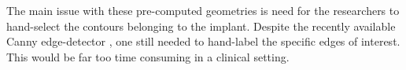 The main issue with these pre-computed geometries is need for the researchers to hand-select the contours belonging to the implant. Despite the recently available Canny edge-detector \cite{cannyComputationalApproachEdge1986}, one still needed to hand-label the specific edges of interest. This would be far too time consuming in a clinical setting.